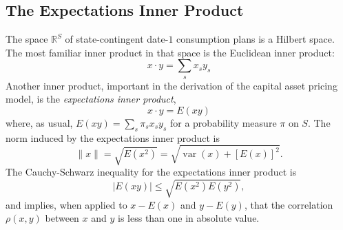 \documentclass[\topdir/lecture\_notes.tex]{subfiles}
\begin{document}
\subsection{The Expectations Inner Product}
The space \(\mathbb{R}^{S}\) of state-contingent date-\(1\) consumption plans is a Hilbert space. The most familiar inner product in that space is the Euclidean inner product:
\begin{equation*}
x \cdot y=\sum_{s} x_{s} y_{s} 
\end{equation*}
Another inner product, important in the derivation of the capital asset pricing model, is the \emph{expectations inner product},
\begin{equation*}
x \cdot y=E(x y) \label{eq:expectations_inner_product} 
\end{equation*}
where, as usual, \(E(x y)=\sum_{s} \pi_{s} x_{s} y_{s}\) for a probability measure \(\pi\) on \(S\). The norm induced by the expectations inner product is
\begin{equation*}
\|x\|=\sqrt{E\left(x^{2}\right)}=\sqrt{\operatorname{var}(x)+[E(x)]^{2}} . 
\end{equation*}
The Cauchy-Schwarz inequality for the expectations inner product is
\begin{equation*}
|E(x y)| \leq \sqrt{E\left(x^{2}\right) E\left(y^{2}\right)}, 
\end{equation*}
and implies, when applied to \(x-E(x)\) and \(y-E(y)\), that the correlation \(\rho(x, y)\) between \(x\) and \(y\) is less than one in absolute value.
\end{document}
